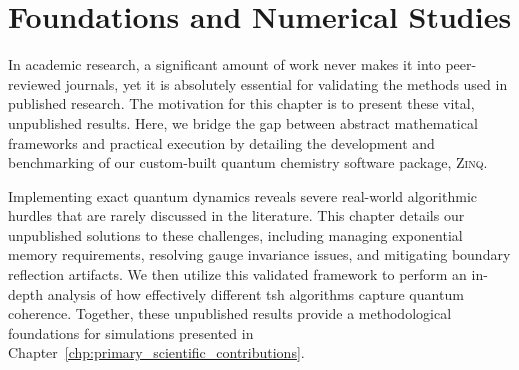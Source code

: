 \chapter{Foundations and Numerical Studies}\label{chp:supporting_numerical_studies}
In academic research, a significant amount of work never makes it into peer-reviewed journals, yet it is absolutely essential for validating the methods used in published research. The motivation for this chapter is to present these vital, unpublished results. Here, we bridge the gap between abstract mathematical frameworks and practical execution by detailing the development and benchmarking of our custom-built quantum chemistry software package, \textsc{Zinq}.\supercite{10.5281/zenodo.18386143}

Implementing exact quantum dynamics reveals severe real-world algorithmic hurdles that are rarely discussed in the literature. This chapter details our unpublished solutions to these challenges, including managing exponential memory requirements, resolving gauge invariance issues, and mitigating boundary reflection artifacts. We then utilize this validated framework to perform an in-depth analysis of how effectively different \gls{tsh} algorithms capture quantum coherence. Together, these unpublished results provide a methodological foundations for simulations presented in Chapter~\ref{chp:primary_scientific_contributions}.


